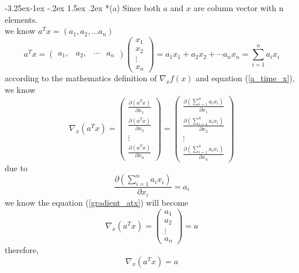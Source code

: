 \documentclass[12pt]{article}
\makeatletter
\renewcommand\subsection{\@startsection{subsection}{2}{\z@}%
	{-3.25ex\@plus -1ex \@minus -.2ex}%
	{1.5ex \@plus .2ex}%
	{\normalfont\large\bfseries}}%
\makeatother
\begin{document}
\subsection*{(a)}
Since both $a$ and $x$ are column vector with n elements.\\
we know $a^{T}x = (a_1, a_2, ... a_n)$
\begin{equation}\label{a_time_x}
	a^{T}x=  
		\left(  
		\begin{array}{cccc}  
			a_{1}, &  
			a_{2}, &   
			\cdots &  
			a_{n}  
		\end{array}  
		\right)  
		\left(  
		\begin{array}{c}  
			x_{1} \\   
			x_{2} \\  
			\vdots \\  
			x_{n}  
		\end{array}  
		\right)
		=a_1x_1+a_2x_2+\cdots a_nx_n
		= \sum_{i=1}^n a_i x_i
\end{equation}
according to the mathematics definition of $\nabla_xf(x)$ and equation (\ref{a_time_x}), we know
\begin{equation}\label{gradient_atx}
	\nabla_x(a^Tx)=
		\left(  
		\begin{array}{c}  
			\frac{\partial(a^Tx)}{\partial x_1} \\
			\frac{\partial(a^Tx)}{\partial x_2} \\
			\vdots \\
			\frac{\partial(a^Tx)}{\partial x_n} 
		\end{array}
		\right)
		=
		\left(  
		\begin{array}{c}  
			\frac{\partial(\sum_{i=1}^n a_i x_i)}{\partial x_1} \\
			\frac{\partial(\sum_{i=1}^n a_i x_i)}{\partial x_2} \\
			\vdots \\
			\frac{\partial(\sum_{i=1}^n a_i x_i)}{\partial x_n} 
		\end{array}
		\right)
\end{equation}
due to
\begin{equation}\label{gradient_atx_i}
	\frac{\partial(\sum_{i=1}^n a_i x_i)}{\partial x_i}=a_i
\end{equation}
we know the equation (\ref{gradient_atx}) will become
\begin{equation}\label{gradient_atx_final}
	\nabla_x(a^Tx)=
	\left(  
		\begin{array}{c}  
			a_1 \\
			a_2 \\
			\vdots \\
			a_n 
		\end{array}
	\right)
	= a
\end{equation}
therefore, $$\nabla_x(a^Tx)=a$$
\end{document}
